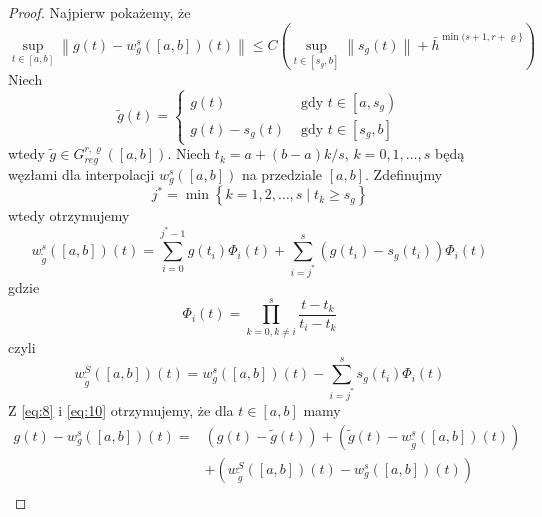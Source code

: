 \documentclass[oik, pdftex, robocza, man]{mgrwms}
\begin{document}
    \begin{proof}
        Najpierw pokażemy, że
        \begin{equation} \label{eq:7}
            \sup _{t \in[a, b]}\left\|g(t)-w_{g}^{s}([a, b])(t)\right\| \leq C\left(\sup _{t \in\left[s_{g}, b\right]}\left\|s_{g}(t)\right\|+\bar{h}^{\min (s+1, r+\varrho\}}\right)
        \end{equation}
        Niech
        \begin{equation} \label{eq:8}
            \tilde{g}(t)= \begin{cases}
                g(t)            & \text { gdy } t \in\left[a, s_{g}\right) \\ 
                g(t)-s_{g}(t)   & \text { gdy } t \in\left[s_{g}, b\right]\end{cases}
        \end{equation}
        wtedy $\tilde{g} \in G_{reg}^{r, \varrho}([a, b])$. Niech $t_{k}=a+(b-a) k / s$, $k=0,1, \ldots, s$ będą węzłami dla interpolacji $w_{g}^{s}([a, b])$ na przedziale $[a, b]$. Zdefinujmy
        \begin{equation} \label{eq:9}
            j^{*}=\min \left\{k=1,2, \ldots, s \mid t_{k} \geq s_{g}\right\}            
        \end{equation}
        wtedy otrzymujemy
        \begin{equation} \label{eq:10}
            w_{\tilde{g}}^{s}([a, b])(t)=\sum_{i=0}^{j^{*}-1} g\left(t_{i}\right) \Phi_{i}(t)+\sum_{i=j^{*}}^{s}\left(g\left(t_{i}\right)-s_{g}\left(t_{i}\right)\right) \Phi_{i}(t)            
        \end{equation}
        gdzie
        \begin{equation*}
            \Phi_{i}(t)=\prod_{k=0, k \neq i}^{s} \frac{t-t_{k}}{t_{i}-t_{k}}
        \end{equation*}
        czyli
        \begin{equation*} \label{eq:11}
            w_{\tilde{g}}^{S}([a, b])(t)=w_{g}^{s}([a, b])(t)-\sum_{i=j^{*}}^{s} s_{g}\left(t_{i}\right) \Phi_{i}(t)
        \end{equation*}
        Z \eqref{eq:8} i \eqref{eq:10} otrzymujemy, że dla $t \in [a, b]$ mamy
        \begin{equation*} \label{eq:12}
            \begin{aligned}
                g(t)-w_{g}^{s}([a, b])(t)=&(g(t)-\tilde{g}(t))+\left(\tilde{g}(t)-w_{\tilde{g}}^{s}([a, b])(t)\right) \\
                &+\left(w_{\tilde{g}}^{S}([a, b])(t)-w_{g}^{s}([a, b])(t)\right) \\

\end{aligned}
\end{equation*}
\end{proof}
\end{document}
